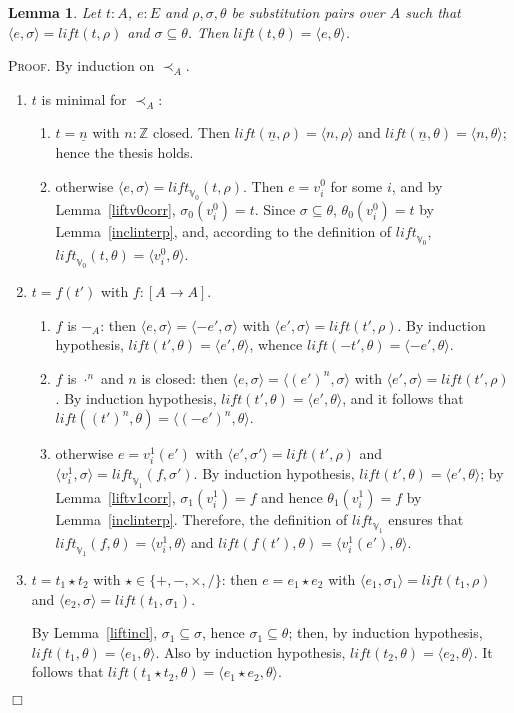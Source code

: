 \documentclass{article}
\newtheorem{lemma}[definition]{Lemma}
\newenvironment{proof}{\smallskip\textsc{Proof.}}{\hspace*{\fill}$\Box$}
\newcommand{\Z}{{\mathbb Z}}
\newcommand{\V}{{\mathbb V}}
\newcommand{\less}{\mathrel{\prec_A}}
\newcommand{\liftv}[1]{\ensuremath{\mathit{lift}_{\V_{#1}}}}
\newcommand{\lift}{\ensuremath{\mathit{lift}}}
\begin{document}
\begin{lemma}\label{liftidempotent}
Let $t:A$, $e:E$ and $\rho,\sigma,\theta$ be substitution pairs over $A$
such that $\langle e,\sigma\rangle=\lift(t,\rho)$ and $\sigma\subseteq\theta$.
Then $\lift(t,\theta)=\langle e,\theta\rangle$.
\end{lemma}
\begin{proof} By induction on $\less$.
\begin{enumerate}
\item $t$ is minimal for $\less$:
\begin{enumerate}
\item $t=\underline n$ with $n:\Z$ closed.  Then
$\lift(\underline n,\rho)=\langle n,\rho\rangle$ and
$\lift(\underline n,\theta)=\langle n,\theta\rangle$; hence the thesis holds.
\item otherwise $\langle e,\sigma\rangle=\liftv0(t,\rho)$.  Then $e=v^0_i$
for some $i$, and by Lemma~\ref{liftv0corr}, $\sigma_0(v^0_i)=t$.
Since $\sigma\subseteq\theta$, $\theta_0(v^0_i)=t$ by Lemma~\ref{inclinterp},
and, according to the definition of $\liftv0$,
$\liftv0(t,\theta)=\langle v^0_i,\theta\rangle$.
\end{enumerate}
\item $t=f(t')$ with $f:[A\to A]$.
\begin{enumerate}
\item $f$ is $-_A$: then
$\langle e,\sigma\rangle=\langle -e',\sigma\rangle$ with
$\langle e',\sigma\rangle=\lift(t',\rho)$.  By induction hypothesis,
$\lift(t',\theta)=\langle e',\theta\rangle$, whence
$\lift(-t',\theta)=\langle -e',\theta\rangle$.
\item $f$ is $\cdot^n$ and $n$ is closed: then
$\langle e,\sigma\rangle=\langle (e')^n,\sigma\rangle$ with
$\langle e',\sigma\rangle=\lift(t',\rho)$.  By induction hypothesis,
$\lift(t',\theta)=\langle e',\theta\rangle$, and it follows that
$\lift((t')^n,\theta)=\langle(-e')^n,\theta\rangle$.
\item otherwise $e=v^1_i(e')$ with
$\langle e',\sigma'\rangle=\lift(t',\rho)$ and
$\langle v^1_i,\sigma\rangle=\liftv1(f,\sigma')$.  By induction
hypothesis, $\lift(t',\theta)=\langle e',\theta\rangle$; by
Lemma~\ref{liftv1corr}, $\sigma_1(v^1_i)=f$ and hence
$\theta_1(v^1_i)=f$ by Lemma~\ref{inclinterp}.  Therefore, the
definition of $\liftv1$ ensures that
$\liftv1(f,\theta)=\langle v^1_i,\theta\rangle$ and
$\lift(f(t'),\theta)=\langle v^1_i(e'),\theta\rangle$.
\end{enumerate}
\item $t=t_1\star t_2$ with $\star\in\{+,-,\times,/\}$: then
$e=e_1\star e_2$ with $\langle e_1,\sigma_1\rangle=\lift(t_1,\rho)$
and $\langle e_2,\sigma\rangle=\lift(t_1,\sigma_1)$.

By Lemma~\ref{liftincl}, $\sigma_1\subseteq\sigma$,
hence $\sigma_1\subseteq\theta$; then, by induction hypothesis,
$\lift(t_1,\theta)=\langle e_1,\theta\rangle$.  Also by induction hypothesis,
$\lift(t_2,\theta)=\langle e_2,\theta\rangle$.  It follows that
$\lift(t_1\star t_2,\theta)=\langle e_1\star e_2,\theta\rangle$.
\end{enumerate}
\end{proof}
\end{document}
